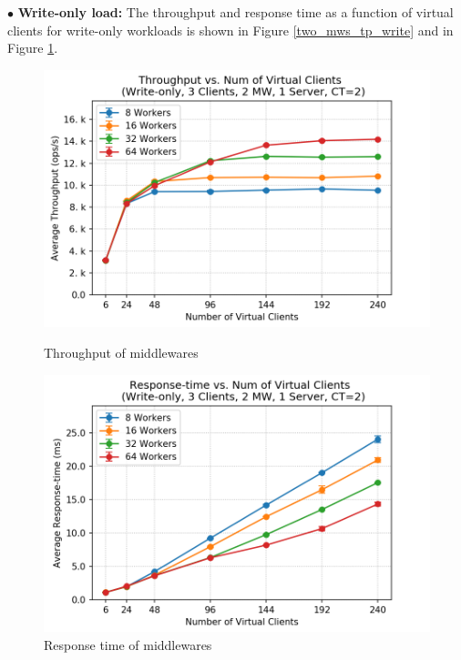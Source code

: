 $\bullet$ \textbf{Write-only load:} 
The throughput and response time as a function of virtual clients for write-only workloads is shown in Figure \ref{two_mws_tp_write} and in Figure \ref{two_mws_rt_write}. 
\begin{figure}[H]
   \begin{minipage}{0.48\textwidth}
     \centering
     \includegraphics[width=1\linewidth]{figures/2_BaselineWithMW/two_mws/two_mws_tp_write_2018-12-07_09h02.png}
     \caption{Throughput of middlewares}\label{two_mws_tp_write}
   \end{minipage}\hfill
   \begin{minipage}{0.48\textwidth}
     \centering
     \includegraphics[width=1\linewidth]{figures/2_BaselineWithMW/two_mws/two_mws_rt_write_2018-12-07_09h02.png}
     \caption{Response time of middlewares}\label{two_mws_rt_write}
   \end{minipage}
\end{figure}
